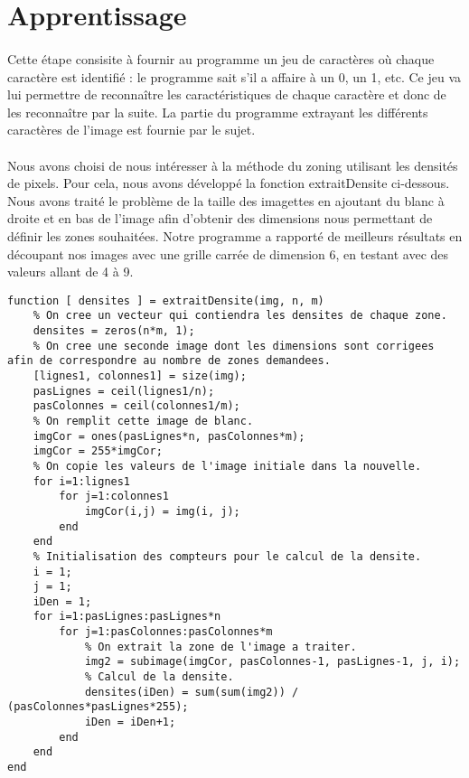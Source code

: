 \section{Apprentissage}

\paragraph{}
Cette étape consisite à fournir au programme un jeu de caractères où chaque caractère est identifié : le programme sait s'il a affaire à un 0, un 1, etc. 
Ce jeu va lui permettre de reconnaître les caractéristiques de chaque caractère et donc de les reconnaître par la suite. La partie du programme extrayant 
les différents caractères de l'image est fournie par le sujet. 

\paragraph{}
Nous avons choisi de nous intéresser à la méthode du zoning utilisant les densités de pixels. Pour cela, nous avons développé la fonction extraitDensite 
ci-dessous.
Nous avons traité le problème de la taille des imagettes en ajoutant du blanc à droite et en bas de l'image afin d'obtenir des dimensions nous permettant de définir les zones souhaitées.
Notre programme a rapporté de meilleurs résultats en découpant nos images avec une grille carrée de dimension 6, en testant avec des valeurs allant de 4 à 9.
\\
\begin{lstlisting}
function [ densites ] = extraitDensite(img, n, m)
	% On cree un vecteur qui contiendra les densites de chaque zone.
	densites = zeros(n*m, 1);
	% On cree une seconde image dont les dimensions sont corrigees afin de correspondre au nombre de zones demandees.
	[lignes1, colonnes1] = size(img);
	pasLignes = ceil(lignes1/n);
	pasColonnes = ceil(colonnes1/m);
	% On remplit cette image de blanc.
	imgCor = ones(pasLignes*n, pasColonnes*m);
	imgCor = 255*imgCor;
	% On copie les valeurs de l'image initiale dans la nouvelle.
	for i=1:lignes1
		for j=1:colonnes1
			imgCor(i,j) = img(i, j);
		end
	end
	% Initialisation des compteurs pour le calcul de la densite.
	i = 1;
	j = 1;
	iDen = 1;
	for i=1:pasLignes:pasLignes*n
		for j=1:pasColonnes:pasColonnes*m
			% On extrait la zone de l'image a traiter.
			img2 = subimage(imgCor, pasColonnes-1, pasLignes-1, j, i);
			% Calcul de la densite.
			densites(iDen) = sum(sum(img2)) / (pasColonnes*pasLignes*255);
			iDen = iDen+1;
		end
	end
end
\end{lstlisting}

